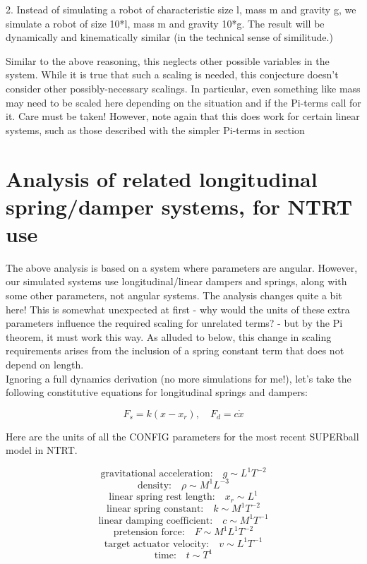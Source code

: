 \documentclass[12pt,letterpaper]{article}
\begin{document}
2. Instead of simulating a robot of characteristic size l, mass m and gravity g, we simulate a robot of size 10*l, mass m and gravity 10*g.
The result will be dynamically and kinematically similar (in the technical sense of similitude.)

Similar to the above reasoning, this neglects other possible variables in the system. 
While it is true that such a scaling is needed, this conjecture doesn't consider other possibly-necessary scalings.
In particular, even something like mass may need to be scaled here depending on the situation and if the Pi-terms call for it.
Care must be taken!
However, note again that this does work for certain linear systems, such as those described with the simpler Pi-terms in section 

\section{Analysis of related longitudinal spring/damper systems, for NTRT use}

The above analysis is based on a system where parameters are angular.
However, our simulated systems use longitudinal/linear dampers and springs, along with some other parameters, not angular systems.
The analysis changes quite a bit here!
This is somewhat unexpected at first - why would the units of these extra parameters influence the required scaling for unrelated terms? - but by the Pi theorem, it must work this way.
As alluded to below, this change in scaling requirements arises from the inclusion of a spring constant term that does not depend on length. \\

Ignoring a full dynamics derivation (no more simulations for me!), let's take the following constitutive equations for longitudinal springs and dampers:

\[
F_s = k(x - x_r), \quad F_d = c \dot x
\]

Here are the units of all the CONFIG parameters for the most recent SUPERball model in NTRT.

\[
\text{gravitational acceleration:} \quad g \sim L^1 T^{-2}
\]
\[
\text{density:} \quad \rho \sim M^1 L^{-3}
\]
\[
\text{linear spring rest length:} \quad x_r \sim L^1
\]
\[
\text{linear spring constant:} \quad k \sim M^1 T^{-2}
\]
\[
\text{linear damping coefficient:} \quad c \sim M^1 T^{-1}
\]
\[
\text{pretension force:} \quad F \sim M^1 L^1 T^{-2}
\]
\[
\text{target actuator velocity:} \quad v \sim L^1 T^{-1}
\]
\[
\text{time:} \quad t \sim T^1
\]
\end{document}
